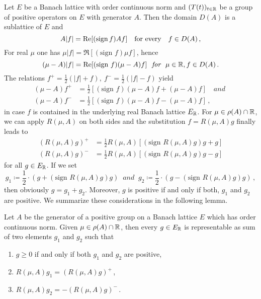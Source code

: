 Let $E$ be a Banach lattice with order continuous norm and $(T(t))_{t \in \R }$
be a group of positive operators on $E$ with generator $A$.
Then the domain $D(A)$ is a sublattice of $E$ and
\begin{equation}\label{eq:c3-4.8}
	A|f| = \Re [(\text{sign\,} f)Af] \quad \text{for every} \quad f \in D(A)\,,
\end{equation}
For real $\mu$ one has $\mu|f| = \Re [(\text{sign } f)\mu f]$, hence
\[
(\mu - A)|f| = \Re[(\text{sign } f)(\mu - A)f] \ \textit{ for } \ \mu \in \R , f \in D(A)\,.
\]
The relations $f^+ = \frac{1}{2}(|f| + f), \ f^- = \frac{1}{2}(|f| - f)$ yield
\begin{align*}
(\mu - A)f^+ &= \frac{1}{2}[(\text{sign } f)(\mu - A)f + (\mu - A)f] \quad\textit{and }\\
(\mu - A)f^- &= \frac{1}{2}[(\text{sign } f)(\mu - A)f - (\mu - A)f]\,,
\end{align*}
in case $f$ is contained in the underlying real Banach lattice $E_{\R }$.
For $\mu \in \rho(A) \cap \R $, we can apply $R(\mu,A)$ on both sides and the substitution $f = R(\mu,A)g$ finally leads to
\begin{equation}\label{eq:c3-4.9}
	\begin{aligned}
	(R(\mu,A)g)^+ &= \frac{1}{2}R(\mu,A) [(\text{sign } R(\mu,A)g)g + g] \\
	(R(\mu,A)g)^- &= \frac{1}{2}R(\mu,A) [(\text{sign } R(\mu,A)g)g - g]
	\end{aligned}
\end{equation}
for all $g \in E_{\R }$. If we set 
\[ 
g_1 \coloneqq \frac{1}{2}\cdot(g + (\text{sign } R(\mu,A)g)g) \ \textit{ and } \ 
g_2 \coloneqq \frac{1}{2}\cdot(g - (\text{sign } R(\mu,A)g)g)\,,
\]
then obviously $g = g_1 + g_2$. Moreover, $g$ is positive if and only if
both, $g_1$ and $g_2$ are positive. We summarize these considerations in
the following lemma.
%
%
\begin{lemma}\label{lem:c3-4.6}
Let $A$ be the generator of a positive group on a Banach
lattice $E$ which has order continuous norm. Given $\mu \in \rho(A) \cap \R $, then
every $g \in E_{\R }$ is representable as sum of two elements $g_1$ and $g_2$
such that
\begin{enumerate}[\upshape (i)]
	\item 
	$g \geq 0$ if and only if both $g_1$ and $g_2$ are positive,
	
	\item
	$R(\mu,A)g_1 = (R(\mu,A)g)^+$\,,

	\item
	$R(\mu,A)g_2 = -(R(\mu,A)g)^-$\,.
\end{enumerate}	
\end{lemma}

